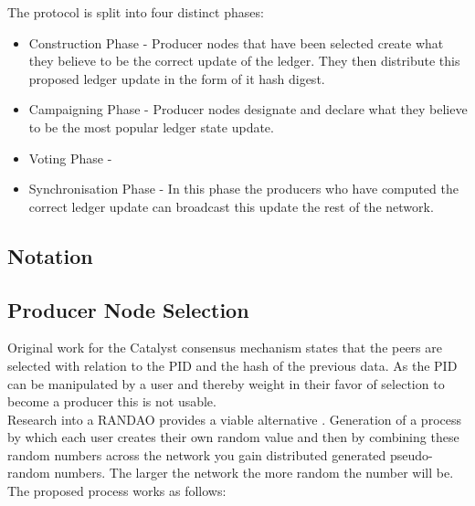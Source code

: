 \documentclass{article}
\begin{document}
The protocol is split into four distinct phases:

\begin{itemize}

\item Construction Phase - Producer nodes that have been selected create what they believe to be the correct update of the ledger. They then distribute this proposed ledger update in the form of it hash digest.
\item Campaigning Phase - Producer nodes designate and declare what they believe to be the most popular ledger state update. 
\item Voting Phase - 	
\item Synchronisation Phase - In this phase the producers who have computed the correct ledger update can broadcast this update the rest of the network. 

\end{itemize} 

\subsection{Notation} 

\subsection{Producer Node Selection} 



Original work for the Catalyst consensus mechanism states that the peers are selected with relation to the PID and the hash of the previous data. As the PID can be manipulated by a user and thereby weight in their favor of selection to become a producer this is not usable. \\

Research into a RANDAO provides a viable alternative \cite{skvorc}\cite{randao}. Generation of a process by which each user creates their own random value and then by combining these random numbers across the network you gain distributed generated pseudo-random numbers. The larger the network the more random the number will be. The proposed process works as follows: \\
\end{document}
